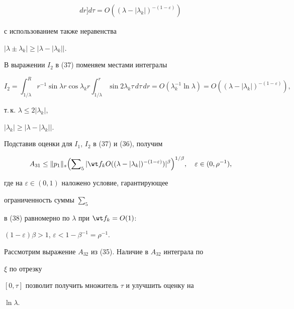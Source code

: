 {\begin{multline*}
dr\biggr]d\tau=O((\lambda-|\lambda_k|)^{-(1-\varepsilon)})


\end{multline*}


с использованием также неравенства


$|\lambda\pm\lambda_k|\ge\bigl|\lambda-|\lambda_k|\bigr|$.





В выражении $I_2$ в (37) поменяем местами интегралы


$$


I_2=\int^R_{1/\lambda}r^{-1}\sin\lambda r\cos\lambda_k r


\int^r_{1/\lambda}\sin 2\lambda_k\tau\,d\tau\,dr=


O(\lambda^{-1}_k\ln\lambda)=


O((\lambda-|\lambda_k|)^{-(1-\varepsilon)}),


$$


т.\,к. $\lambda\le 2|\lambda_k|$,


$|\lambda_k|\ge\bigl|\lambda-|\lambda_k|\bigr|$.





Подставив оценки для $I_1$, $I_2$ в (37) и (36), получим


\begin{equation}


A_{31}\le\|p_1\|_s\Bigl(\sumn_5|\wt f_k O((\lambda-|\lambda_k|


)^{-(1-\varepsilon)})|^\beta\Bigr)^{1/\beta},\quad


\varepsilon\in(0,\rho^{-1}),


\end{equation}


где на $\varepsilon\in(0,1)$ наложено условие, гарантирующее


ограниченность суммы $\sum_5$


в (38) равномерно по $\lambda$ при $\wt f_k=O(1)$:


$(1-\varepsilon)\beta>1$, $\varepsilon<1-\beta^{-1}=\rho^{-1}$.





Рассмотрим выражение $A_{32}$ из (35). Наличие в $A_{32}$ интеграла по


$\xi$ по отрезку


$[0,\tau]$ позволит получить множитель $\tau$ и улучшить оценку на


$\ln\lambda$.


}
